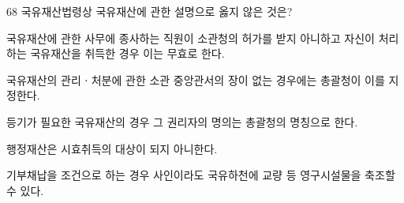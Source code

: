 \begin{question}{68}
국유재산법령상 국유재산에 관한 설명으로 옳지 않은 것은?
\begin{choices}
  \item 국유재산에 관한 사무에 종사하는 직원이 소관청의 허가를 받지 아니하고 자신이 처리하는 국유재산을 취득한 경우 이는 무효로 한다.
  \item 국유재산의 관리ㆍ처분에 관한 소관 중앙관서의 장이 없는 경우에는 총괄청이 이를 지정한다.
  \item 등기가 필요한 국유재산의 경우 그 권리자의 명의는 총괄청의 명칭으로 한다.
  \item 행정재산은 시효취득의 대상이 되지 아니한다.
  \item 기부채납을 조건으로 하는 경우 사인이라도 국유하천에 교량 등 영구시설물을 축조할 수 있다.
\end{choices}
\end{question}
